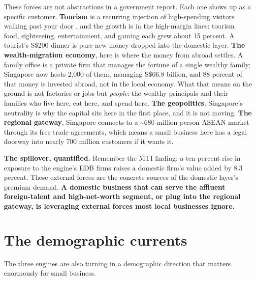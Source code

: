 \documentclass[10pt,twoside,openany]{memoir}
\newcommand{\needspacehead}{\needspace{4\baselineskip}}
\let\oldsection\section
\renewcommand{\section}{\needspacehead\oldsection}
\begin{document}
{{{{{{{{{{{{These forces are not abstractions in a government report. Each one shows
up as a specific customer. \textbf{Tourism} is a recurring injection of
high-spending visitors walking past your door \cite{stb-tourism}, and
the growth is in the high-margin lines: tourism food, sightseeing,
entertainment, and gaming each grew about 15 percent. A tourist's S\$200
dinner is pure new money dropped into the domestic layer. \textbf{The
wealth-migration economy}, here is where the money from abroad settles.
A family office is a private firm that manages the fortune of a single
wealthy family; Singapore now hosts 2,000 of them, managing S\$66.8
billion, and 88 percent of that money is invested abroad, not in the
local economy. What that means on the ground is not factories or jobs
but \emph{people}: the wealthy principals and their families who live
here, eat here, and spend here. \textbf{The geopolitics}, Singapore's
neutrality is why the capital sits here in the first place, and it is
not moving. \textbf{The regional gateway}, Singapore connects to a
\textasciitilde680-million-person ASEAN market through its free trade
agreements, which means a small business here has a legal doorway into
nearly 700 million customers if it wants it.

\textbf{The spillover, quantified.} Remember the MTI finding: a ten
percent rise in exposure to the engine's EDB firms raises a domestic
firm's value added by 8.3 percent. These external forces are the
concrete sources of the domestic layer's premium demand. \textbf{A
domestic business that can serve the affluent foreign-talent and
high-net-worth segment, or plug into the regional gateway, is leveraging
external forces most local businesses ignore.}

\section{The demographic currents}\label{the-demographic-currents}

The three engines are also turning in a demographic direction that
matters enormously for small business.

}}}}}}}}}}}}
\end{document}
